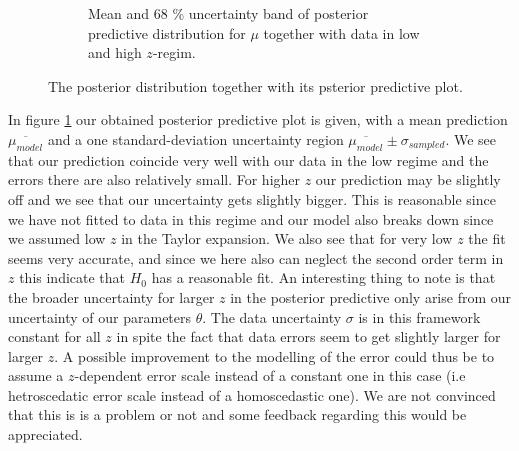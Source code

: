 \documentclass[11pt,a4paper]{article}
\begin{document}
\begin{figure}[ht]
\begin{subfigure}{.45\textwidth}
          \caption{Mean and 68 \% uncertainty band of posterior predictive distribution for $\mu$ together with data in low and high $z$-regim.}
          \label{fig:posterior_pred}
    \end{subfigure}
    \caption{The posterior distribution together with its psterior predictive plot. }
    \label{fig:posterior_task1}
\end{figure}

In figure \ref{fig:posterior_pred} our obtained posterior predictive plot is given, with a mean prediction $\overline{\mu_{model}}$ and a one standard-deviation uncertainty region $\overline{\mu_{model}} \pm \sigma_{sampled}$. We see that our prediction coincide very well with our data in the low regime and the errors there are also relatively small. For higher $z$ our prediction may be slightly off and we see that our uncertainty gets slightly bigger. This is reasonable since we have not fitted to data in this regime and our model also breaks down since we assumed low $z$ in the Taylor expansion. We also see that for very low $z$ the fit seems very accurate, and since we here also can neglect the second order term in $z$ this indicate that $H_0$ has a reasonable fit. An interesting thing to note is that the broader uncertainty for larger $z$ in the posterior predictive only arise from our uncertainty of our parameters $\theta$. The data uncertainty $\sigma$ is in this framework constant for all $z$ in spite the fact that data errors seem to get slightly larger for larger $z$. A possible improvement to the modelling of the error could thus be to assume a $z$-dependent error scale instead of a constant one in this case (i.e hetroscedatic error scale instead of a homoscedastic one). We are not convinced that this is is a problem or not and some feedback regarding this would be appreciated.
\end{document}
